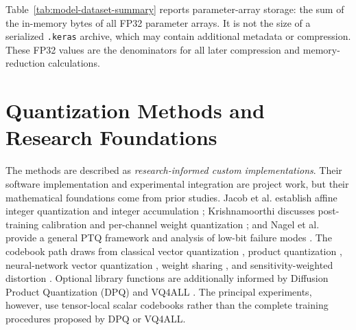 \documentclass[conference]{IEEEtran}
\begin{document}
\begin{table}[t]
\caption{Models, datasets, and FP32 reference measurements}
\label{tab:model-dataset-summary}
\centering
\small
{}
\end{table}

Table~\ref{tab:model-dataset-summary} reports parameter-array storage: the sum of the in-memory bytes of all FP32 parameter arrays. It is not the size of a serialized \texttt{.keras} archive, which may contain additional metadata or compression. These FP32 values are the denominators for all later compression and memory-reduction calculations.

\section{Quantization Methods and Research Foundations}
\label{sec:methods}

The methods are described as \emph{research-informed custom implementations}. Their software implementation and experimental integration are project work, but their mathematical foundations come from prior studies. Jacob et al. establish affine integer quantization and integer accumulation \cite{jacob2018}; Krishnamoorthi discusses post-training calibration and per-channel weight quantization \cite{krishnamoorthi2018}; and Nagel et al. provide a general PTQ framework and analysis of low-bit failure modes \cite{nagel2021}. The codebook path draws from classical vector quantization \cite{gray1984}, product quantization \cite{jegou2011}, neural-network vector quantization \cite{gong2014}, weight sharing \cite{han2016}, and sensitivity-weighted distortion \cite{choi2017}. Optional library functions are additionally informed by Diffusion Product Quantization (DPQ) \cite{shao2024} and VQ4ALL \cite{deng2024}. The principal experiments, however, use tensor-local scalar codebooks rather than the complete training procedures proposed by DPQ or VQ4ALL.
\end{document}
